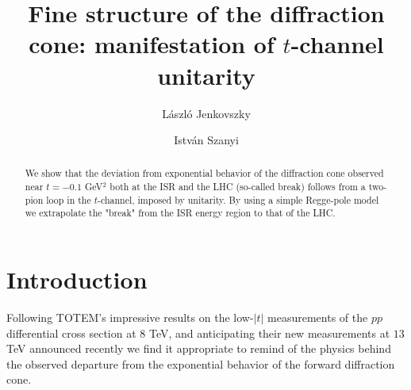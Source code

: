 \documentclass[aps,prd,superscriptaddress,showpacs,preprintnumbers]{revtex4}
\begin{document}
\newcommand{\dlt}{\bigtriangleup}
\newcommand{\beq}{\begin{equation}}
\newcommand{\eeq}[1]{\label{#1} \end{equation}}
\newcommand{\insertplot}[1]{\centerline{\psfig{figure={#1},width=14.5cm}}}

\parskip=0.3cm


\title{Fine structure of the diffraction cone: manifestation of $t$-channel unitarity}




\author{L\'aszl\'o Jenkovszky}

\author{Istv\'an Szanyi}


\begin{abstract}
We show that the deviation from exponential behavior of the diffraction cone observed near $t=-0.1$ GeV$^2$ both at the ISR and the LHC (so-called break) follows from a two-pion loop in the $t$-channel, imposed by unitarity. By using a simple Regge-pole model we extrapolate the "break" from the ISR energy region to that of the LHC. 

\end{abstract}


\maketitle

\section{Introduction} \label{s1}

Following TOTEM's impressive results \cite{TOTEM8} on the low-$|t|$ measurements of the $pp$ differential cross section at $8$ TeV, and anticipating their new measurements at $13$ TeV announced recently \cite{TOTEM13} we find it appropriate to remind of the physics behind the observed departure from the exponential behavior of the forward diffraction cone.
\end{document}

